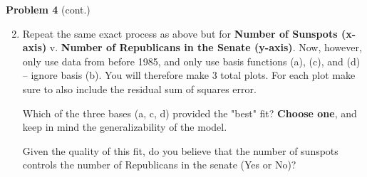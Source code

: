 \documentclass[submit]{harvardml}
\begin{document}
\begin{framed}
\noindent\textbf{Problem 4} (cont.)\\
\begin{enumerate}
\setcounter{enumi}{1}
\item Repeat the same exact process as above but for \textbf{Number of Sunspots (x-axis)} v. \textbf{Number of Republicans in the Senate (y-axis)}. 
Now, however, only use data from before 1985, and only use basis functions (a), (c), and (d) -- ignore basis (b). You will therefore make 3 total plots. For each plot make sure to also include the residual sum of squares error.



Which of the three bases (a, c, d) provided the "best" fit? \textbf{Choose one}, and keep in mind the generalizability of the model. 

Given the quality of this fit, do you believe that the number of sunspots controls the number of Republicans in the senate (Yes or No)?
\end{enumerate}
\end{framed}

\newpage
\end{document}
